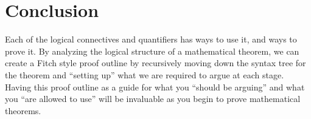 \documentclass{article}
\begin{document}
\section{Conclusion}

Each of the logical connectives and quantifiers has ways to use it, and ways to prove it.  By analyzing the logical structure of a mathematical theorem, we can create a Fitch style proof outline by recursively moving down the syntax tree for the theorem and ``setting up'' what we are required to argue at each stage.  Having this proof outline as a guide for what you ``should be arguing'' and what you ``are allowed to use'' will be invaluable as you begin to prove mathematical theorems.


















	
\end{document}
